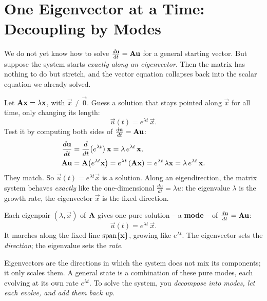 \section{One Eigenvector at a Time: Decoupling by Modes}
\label{ch25:onemode}

We do not yet know how to solve
$\frac{d\mathbf{u}}{dt} = \mathbf{A}\mathbf{u}$ for a general starting vector. But suppose
the system starts \emph{exactly along an eigenvector}. Then the
matrix has nothing to do but stretch, and the vector equation collapses back into
the scalar equation we already solved.

Let $\mathbf{A}\mathbf{x} = \lambda\mathbf{x}$, with $\vec{x}\neq\vec{0}$. Guess a solution
that stays pointed along $\vec{x}$ for all time, only changing its length:
\[
  \vec{u}(t) = e^{\lambda t}\,\vec{x}.
\]
Test it by computing both sides of $\frac{d\mathbf{u}}{dt} = \mathbf{A}\mathbf{u}$:
\begin{align*}
  \frac{d\mathbf{u}}{dt} &= \frac{d}{dt}\!\left(e^{\lambda t}\right)\mathbf{x}
  = \lambda\, e^{\lambda t}\,\mathbf{x},\\
  \mathbf{A}\mathbf{u} &= \mathbf{A}\!\left(e^{\lambda t}\mathbf{x}\right)
  = e^{\lambda t}\,(\mathbf{A}\mathbf{x})
  = e^{\lambda t}\,\lambda\mathbf{x}
  = \lambda\,e^{\lambda t}\,\mathbf{x}.
\end{align*}
They match. So $\vec{u}(t) = e^{\lambda t}\vec{x}$ is a solution. Along an
eigendirection, the matrix system behaves \emph{exactly} like the one-dimensional
$\frac{du}{dt} = \lambda u$: the eigenvalue $\lambda$ is the growth rate, the
eigenvector $\vec{x}$ is the fixed direction.

\begin{focusbox}
Each eigenpair $(\lambda,\vec{x})$ of $\mathbf{A}$ gives one pure solution -- a
\textbf{mode} -- of $\frac{d\mathbf{u}}{dt}=\mathbf{A}\mathbf{u}$:
\[
  \vec{u}(t) = e^{\lambda t}\,\vec{x}.
\]
It marches along the fixed line $\operatorname{span}\{\mathbf{x}\}$, growing like $e^{\lambda t}$.
The eigenvector sets the \emph{direction}; the eigenvalue sets the \emph{rate}.
\end{focusbox}

\begin{intuitionbox}
Eigenvectors are the directions in which the system does not mix its
components; it only scales them. A general state is a combination of these pure
modes, each evolving at its own rate $e^{\lambda t}$. To solve the system, you
\emph{decompose into modes, let each evolve, and add
them back up.}
\end{intuitionbox}

